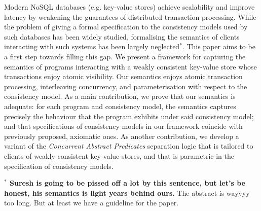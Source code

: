 Modern NoSQL databases (e.g. key-value stores) achieve scalability and improve 
latency by weakening the guarantees of distributed transaction 
processing. While the problem of giving a formal specification to 
the consistency models used by such databases has been widely 
studied, formalising the semantics of clients interacting with 
such systems has been largely neglected$^\ast$. 
This paper aims to be a 
first step towards filling this gap. We present a framework 
for capturing the semantics of programs interacting with a 
weakly consistent key-value store whose transactions enjoy atomic visibility. 
Our semantics enjoys 
atomic transaction processing, interleaving concurrency, 
and parameterisation with respect to the consistency model.  
As a main contribution, we prove that our semantics is adequate: 
for each program and consistency model, the semantics captures 
precisely the behaviour that the program exhibits under said consistency model; 
and that specifications of consistency models in our framework 
coincide with previously proposed, axiomatic ones.
As another contribution, we develop a variant of the \emph{Concurrent 
Abstract Predicates} separation logic
that is tailored to clients of weakly-consistent key-value stores, 
and that is parametric in the specification of consistency models.

\textbf{$^\ast$ Suresh is going to be pissed off a lot by this sentence, but 
let's be honest, his semantics is light years behind ours.}
\ac{The abstract is wayyyy too long. But at least we have a guideline for the paper.}

